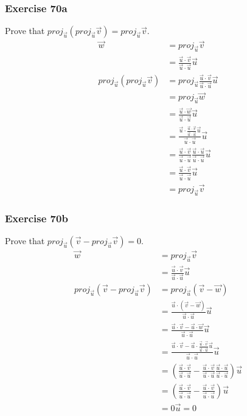 \documentclass[letterpaper, 12pt]{math}
\begin{document}
\subsubsection*{Exercise 70a}
Prove that \( proj_{\vec{u}}(proj_{\vec{u}}\vec{v}) = proj_{\vec{u}}\vec{v} \).
\begin{align*}
  \vec{w} &= proj_{\vec{u}}\vec{v} \\
  &= \frac{\vec{u}\cdot\vec{v}}{\vec{u}\cdot\vec{u}}\vec{u} \\
  proj_{\vec{u}}(proj_{\vec{u}}\vec{v}) &= proj_{\vec{u}}
    \frac{\vec{u}\cdot\vec{v}}{\vec{u}\cdot\vec{u}}\vec{u} \\
  &= proj_{\vec{u}}\vec{w} \\
  &= \frac{\vec{u}\cdot\vec{w}}{\vec{u}\cdot\vec{u}}\vec{u} \\
  &= \frac{\vec{u}\cdot\frac{\vec{u}\cdot\vec{v}}{\vec{u}\cdot\vec{u}}\vec{u}}
    {\vec{u}\cdot\vec{u}}\vec{u} \\
  &= \frac{\vec{u}\cdot\vec{v}}{\vec{u}\cdot\vec{u}}
    \frac{\vec{u}\cdot\vec{u}}{\vec{u}\cdot\vec{u}}\vec{u} \\
  &= \frac{\vec{u}\cdot\vec{v}}{\vec{u}\cdot\vec{u}}\vec{u} \\
  &= proj_{\vec{u}}\vec{v}
\end{align*}

\subsubsection*{Exercise 70b}
Prove that \( proj_{\vec{u}}(\vec{v}-proj_{\vec{u}}\vec{v}) = 0 \).
\begin{align*}
  \vec{w} &= proj_{\vec{u}}\vec{v} \\
  &= \frac{\vec{u}\cdot\vec{v}}{\vec{u}\cdot\vec{u}}\vec{u} \\
  proj_{\vec{u}}(\vec{v}-proj_{\vec{u}}\vec{v}) &=
    proj_{\vec{u}}(\vec{v}-\vec{w}) \\
  &= \frac{\vec{u}\cdot(\vec{v}-\vec{w})}{\vec{u}\cdot\vec{u}}\vec{u} \\
  &= \frac{\vec{u}\cdot\vec{v}-\vec{u}\cdot\vec{w}}
    {\vec{u}\cdot\vec{u}}\vec{u} \\
  &= \frac{\vec{u}\cdot\vec{v}-\vec{u}\cdot
    \frac{\vec{u}\cdot\vec{v}}{\vec{u}\cdot\vec{u}}\vec{u}}
    {\vec{u}\cdot\vec{u}}\vec{u} \\
  &= \left(\frac{\vec{u}\cdot\vec{v}}{\vec{u}\cdot\vec{u}}-
    \frac{\vec{u}\cdot\vec{v}}{\vec{u}\cdot\vec{u}}
    \frac{\vec{u}\cdot\vec{u}}{\vec{u}\cdot\vec{u}}\right)\vec{u} \\
  &= \left(\frac{\vec{u}\cdot\vec{v}}{\vec{u}\cdot\vec{u}}-
    \frac{\vec{u}\cdot\vec{v}}{\vec{u}\cdot\vec{u}}\right)\vec{u} \\
  &= 0\vec{u} = 0
\end{align*}
\end{document}
